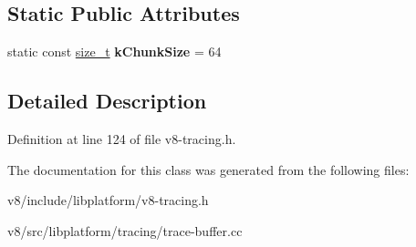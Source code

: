 \subsection*{Static Public Attributes}
\begin{DoxyCompactItemize}
\item 
\mbox{\label{classv8_1_1platform_1_1tracing_1_1TraceBufferChunk_a7a71bfc9c633266ce12a28cb009a2b1f}} 
static const \mbox{\hyperlink{classsize__t}{size\+\_\+t}} {\bfseries k\+Chunk\+Size} = 64
\end{DoxyCompactItemize}


\subsection{Detailed Description}


Definition at line 124 of file v8-\/tracing.\+h.



The documentation for this class was generated from the following files\+:\begin{DoxyCompactItemize}
\item 
v8/include/libplatform/v8-\/tracing.\+h\item 
v8/src/libplatform/tracing/trace-\/buffer.\+cc\end{DoxyCompactItemize}
